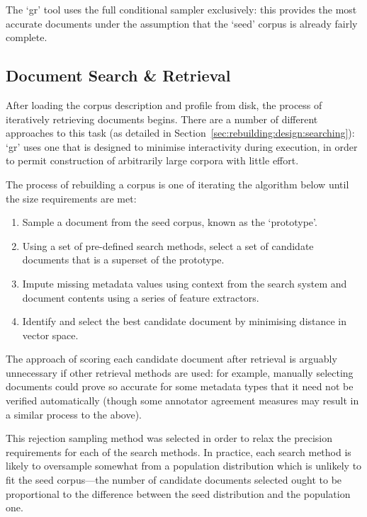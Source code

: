 The `gr' tool uses the full conditional sampler exclusively: this provides the most accurate documents under the assumption that the `seed' corpus is already fairly complete.





\subsection{Document Search \& Retrieval}
After loading the corpus description and profile from disk, the process of iteratively retrieving documents begins.  There are a number of different approaches to this task (as detailed in Section~\ref{sec:rebuilding:design:searching}): `gr' uses one that is designed to minimise interactivity during execution, in order to permit construction of arbitrarily large corpora with little effort.

The process of rebuilding a corpus is one of iterating the algorithm below until the size requirements are met:

\begin{enumerate}
    \item Sample a document from the seed corpus, known as the `prototype'.
    \item Using a set of pre-defined search methods, select a set of candidate documents that is a superset of the prototype.
    \item Impute missing metadata values using context from the search system and document contents using a series of feature extractors.
    \item Identify and select the best candidate document by minimising distance in vector space.
\end{enumerate}

The approach of scoring each candidate document after retrieval is arguably unnecessary if other retrieval methods are used: for example, manually selecting documents could prove so accurate for some metadata types that it need not be verified automatically (though some annotator agreement measures may result in a similar process to the above).

This rejection sampling method was selected in order to relax the precision requirements for each of the search methods.  In practice, each search method is likely to oversample somewhat from a population distribution which is unlikely to fit the seed corpus---the number of candidate documents selected ought to be proportional to the difference between the seed distribution and the population one.

